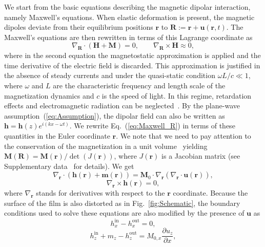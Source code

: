 \documentclass[10pt]{iopart}
\begin{document}
We start from the basic equations describing the magnetic dipolar interaction, namely Maxwell's equations. When elastic deformation is present, the magnetic dipoles deviate from their equilibrium positions $\bm{r}$ to $\bm{R}:=\bm{r}+\bm{u}(\bm{r},t)$. The Maxwell's equations are then rewritten in terms of this Lagrange coordinate as
\begin{equation}
    \nabla_{\bm{R}}\cdot \left(\bm{H}+\bm{M}\right)=0,\qquad
    \nabla_{\bm{R}}\times \bm{H}\approx 0,\label{eq:Maxwell_R}
\end{equation}
where in the second equation the magnetostatic approximation is applied and the time derivative of the electric field is discarded. This approximation is justified in the absence of steady currents and under the quasi-static condition $\omega L / c \ll 1$, where $\omega$ and $L$ are the characteristic frequency and length scale of the magnetization dynamics and $c$ is the speed of light. In this regime, retardation effects and electromagnetic radiation can be neglected~\cite{Stancil_TheoryofMagnetostaticWaves}. By the plane-wave assumption~(\ref{eq:Assumption}), the dipolar field can also be written as $\bm{h}=\bm{h}(z)e^{i(kx-\omega t)}$. We rewrite Eq.~(\ref{eq:Maxwell_R}) in terms of these quantities in the Euler coordinate $\bm{r}$. We note that we need to pay attention to the conservation of the magnetization in a unit volume~\cite{Yamamoto_Maekawa_AnnPhys} yielding $\bm{M}(\bm{R})=\bm{M}(\bm{r})/\det(J(\bm{r}))$, where $J(\bm{r})$ is a Jacobian matrix (see Supplementary data~\cite{SM} for details). We get
\begin{equation}
    \nabla_{\bm{r}}\cdot\left(\bm{h}(\bm{r})+\bm{m}(\bm{r})\right)=\bm{M}_0\cdot\nabla_{\bm{r}}\left(\nabla_{\bm{r}}\cdot\bm{u}(\bm{r})\right),\label{eq:Maxwell_couple_div}
\end{equation}
\begin{equation}
    \nabla_{\bm{r}}\times\bm{h}(\bm{r})=0,\label{eq:Maxwell_couple_rot}
\end{equation}
where $\nabla_{\bm{r}}$ stands for derivatives with respect to the $\bm{r}$ coordinate. Because the surface of the film is also distorted as in Fig.~\ref{fig:Schematic}, the boundary conditions used to solve these equations are also modified by the presence of $\bm{u}$ as
\begin{equation}
    h^{\mathrm{in}}_x-h_x^{\mathrm{out}}=0,\label{eq:Maxwell_bc_x}
\end{equation}
\begin{equation}
    h^{\mathrm{in}}_z+m_z-h^{\mathrm{out}}_z=M_{0,x}\frac{\partial u_z}{\partial x},\label{eq:Maxwell_bc_z}
\end{equation}
\end{document}
